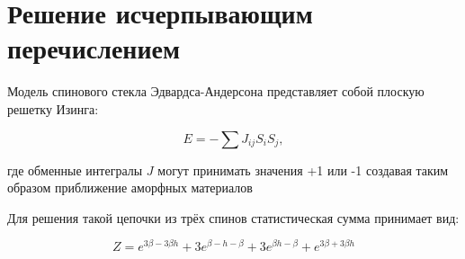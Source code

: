 \documentclass[utf8, babel, sor, jor, amsmath, amssymb, reprint]{elsarticle} %
\begin{document}
\section{Решение исчерпывающим перечислением}

Модель спинового стекла Эдвардса-Андерсона представляет собой плоскую решетку Изинга:

\begin{equation}
	E = -\sum J_{ij} S_i S_j,
	\label{eq:ising_energy}
\end{equation}

 где обменные интегралы $J$ могут принимать значения +1 или -1 создавая таким образом приближение аморфных материалов

Для решения такой цепочки из трёх спинов статистическая сумма
принимает вид:

\begin{equation}
	Z = e^{3\beta - 3\beta h} + 3e^{\beta - h - \beta} + 3e^{\beta h - \beta} + e^{3\beta + 3\beta h}
	\label{eq:stat_3}
\end{equation}
\end{document}
